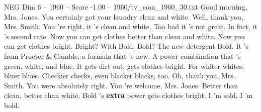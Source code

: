 \begin{textsample}{NEG Dim 6 – 1960 – Score -1.00 – 1960/tv\_com\_1960\_30.txt}  \label{ex:f6_neg_076}
Good morning, Mrs.
Jones.
You certainly got your laundry clean and white.
Well, thank you, Mrs.
Smith.
You 're right, it 's clean and white.
Too bad it 's not great.
In fact, it 's second rate.
Now you can get clothes better than clean and white.
Now you can get clothes bright.
Bright?
With Bold.
Bold?
The new detergent Bold.
It 's from Procter \& Gamble, a formula that 's new.
A power combination that 's green, white, and blue.
It gets dirt out, gets clothes bright.
For whiter whites, bluer blues.
Checkier checks, even blacker blacks, too.
Oh, thank you, Mrs.
Smith.
You were absolutely right.
You 're welcome, Mrs.
Jones.
Better than clean, better than white.
Bold 's \textbf{extra} power gets clothes bright.
I 'm sold.
I 'm bold.

\end{textsample}
